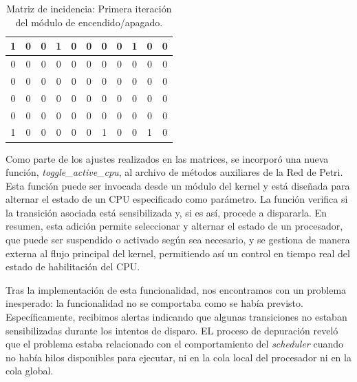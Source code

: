 \begin{table}[H]
    \centering
    \begin{tabular}{|c|c|c|c|c|c|c|c|c|c|c|}
        \hline
        1 & 0 & 0 & 1 & 0 & 0 & 0 & 0 & 1 & \cellcolor{lightgray}0 & \cellcolor{lightgray}0 \\
        \hline
        0 & 0 & 0 & 0 & 0 & 0 & 0 & 0 & 0 & \cellcolor{lightgray}0 & \cellcolor{lightgray}0 \\
        \hline
        0 & 0 & 0 & 0 & 0 & 0 & 0 & 0 & 0 & \cellcolor{lightgray}0 & \cellcolor{lightgray}0 \\
        \hline
        0 & 0 & 0 & 0 & 0 & 0 & 0 & 0 & 0 & \cellcolor{lightgray}0 & \cellcolor{lightgray}0 \\
        \hline
        0 & 0 & 0 & 0 & 0 & 0 & 0 & 0 & 0 & \cellcolor{lightgray}0 & \cellcolor{lightgray}0 \\
        \hline
        \cellcolor{lightgray}1 & \cellcolor{lightgray}0 & \cellcolor{lightgray}0 & \cellcolor{lightgray}0 & \cellcolor{lightgray}0 & \cellcolor{lightgray}0 & \cellcolor{lightgray}1 & \cellcolor{lightgray}0 & \cellcolor{lightgray}0 & \cellcolor{lightgray}1 & \cellcolor{lightgray}0 \\
        \hline
    \end{tabular}
    \caption{Matriz de incidencia: Primera iteración del módulo de encendido/apagado.}
    \label{tabla:matriz_incidencia_post}
\end{table}

Como parte de los ajustes realizados en las matrices, se incorporó una nueva función, \textit{toggle\_active\_cpu}, al archivo de métodos auxiliares de la Red de Petri. Esta función puede ser invocada desde un módulo del kernel y está diseñada para alternar el estado de un CPU especificado como parámetro. La función verifica si la transición asociada está sensibilizada y, si es así, procede a dispararla. En resumen, esta adición permite seleccionar y alternar el estado de un procesador, que puede ser suspendido o activado según sea necesario, y se gestiona de manera externa al flujo principal del kernel, permitiendo así un control en tiempo real del estado de habilitación del CPU.\par

Tras la implementación de esta funcionalidad, nos encontramos con un problema inesperado: la funcionalidad no se comportaba como se había previsto. Específicamente, recibimos alertas indicando que algunas transiciones no estaban sensibilizadas durante los intentos de disparo. EL proceso de depuración reveló que el problema estaba relacionado con el comportamiento del \textit{scheduler} cuando no había hilos disponibles para ejecutar, ni en la cola local del procesador ni en la cola global.

